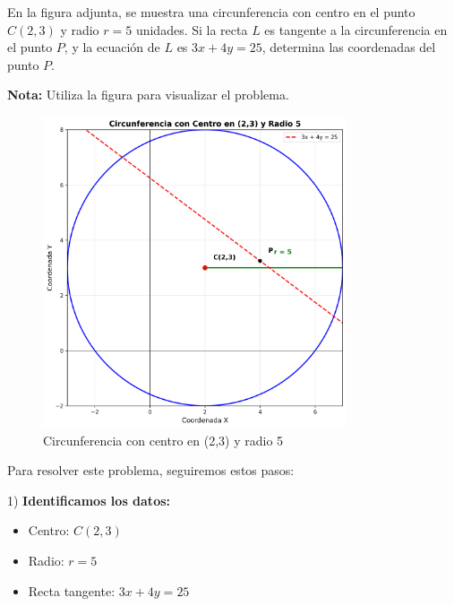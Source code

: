 \begin{ejercicio}[
  id=GEO_CIRC_001,
  materia=geometria,
  capitulo=circunferencia,
  nivel=intermedio,
  procedencia="Examen UNI 2024",
  visibilidad=true,
  libros={geometria_pre, geometria_avanzado},
  youtube_url="https://www.youtube.com/watch?v=ejemplo_geometria",
  mostrar_solucion=true,
  libro_promocion=""
]
En la figura adjunta, se muestra una circunferencia con centro en el punto $C(2,3)$ y radio $r = 5$ unidades. Si la recta $L$ es tangente a la circunferencia en el punto $P$, y la ecuación de $L$ es $3x + 4y = 25$, determina las coordenadas del punto $P$.

\textbf{Nota:} Utiliza la figura para visualizar el problema.

\begin{figure}[h]
\centering
\includegraphics[width=0.8\textwidth]{imagenes/circulo_001.png}
\caption{Circunferencia con centro en (2,3) y radio 5}
\label{fig:circulo}
\end{figure}

\begin{solucion}
Para resolver este problema, seguiremos estos pasos:

1) \textbf{Identificamos los datos:}
   \begin{itemize}
   \item Centro: $C(2,3)$
   \item Radio: $r = 5$
   \item Recta tangente: $3x + 4y = 25$
   \end{itemize}


\end{solucion}
\end{ejercicio}
